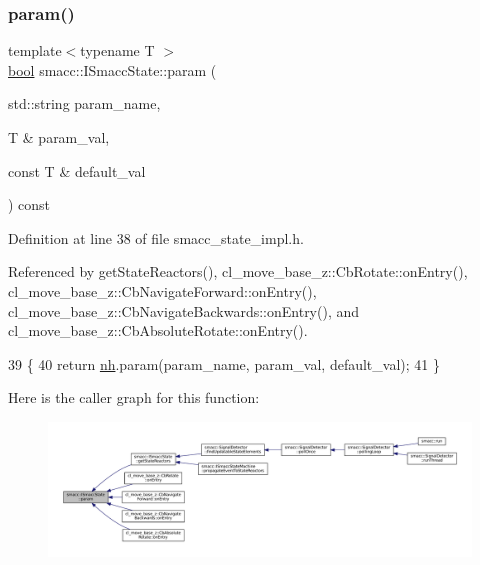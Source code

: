\subsubsection{\texorpdfstring{param()}{param()}}
{\footnotesize\ttfamily template$<$typename T $>$ \\
\hyperlink{classbool}{bool} smacc\+::\+I\+Smacc\+State\+::param (\begin{DoxyParamCaption}\item[{std\+::string}]{param\+\_\+name,  }\item[{T \&}]{param\+\_\+val,  }\item[{const T \&}]{default\+\_\+val }\end{DoxyParamCaption}) const}



Definition at line 38 of file smacc\+\_\+state\+\_\+impl.\+h.



Referenced by get\+State\+Reactors(), cl\+\_\+move\+\_\+base\+\_\+z\+::\+Cb\+Rotate\+::on\+Entry(), cl\+\_\+move\+\_\+base\+\_\+z\+::\+Cb\+Navigate\+Forward\+::on\+Entry(), cl\+\_\+move\+\_\+base\+\_\+z\+::\+Cb\+Navigate\+Backwards\+::on\+Entry(), and cl\+\_\+move\+\_\+base\+\_\+z\+::\+Cb\+Absolute\+Rotate\+::on\+Entry().


\begin{DoxyCode}
39 \{
40     \textcolor{keywordflow}{return} \hyperlink{classsmacc_1_1ISmaccState_a13fe6e6abfdb87996402189d44b78494}{nh}.param(param\_name, param\_val, default\_val);
41 \}
\end{DoxyCode}
Here is the caller graph for this function\+:
\nopagebreak
\begin{figure}[H]
\begin{center}
\leavevmode
\includegraphics[width=350pt]{classsmacc_1_1ISmaccState_a4f2ff8e3eda8aa9bbb60c8ff17d0def1_icgraph}
\end{center}
\end{figure}
\mbox{\label{classsmacc_1_1ISmaccState_acef404ab3766ddf2892e8dad14a4a7cf}} 

